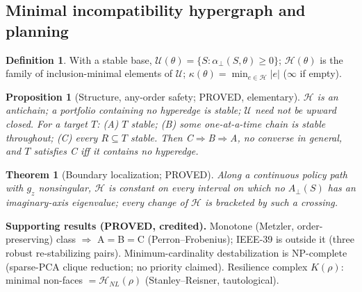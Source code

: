 \documentclass[10pt,a4paper]{article}
\newtheorem{theorem}{Theorem}
\newtheorem{proposition}{Proposition}
\theoremstyle{definition}
\newtheorem{definition}{Definition}
\newcommand{\Hy}{\mathcal{H}}
\newcommand{\aperp}{\alpha_\perp}
\newcommand{\Aperp}{A_\perp}
\newcommand{\status}[1]{\textsf{\small #1}}
\begin{document}
\subsection{Minimal incompatibility hypergraph and planning}
\begin{definition}
With a stable base, $\mathcal U(\theta)=\{S:\aperp(S,\theta)\ge0\}$; $\Hy(\theta)$ is the family of
inclusion-minimal elements of $\mathcal U$; $\kappa(\theta)=\min_{e\in\Hy}|e|$ ($\infty$ if empty).
\end{definition}
\begin{proposition}[Structure, any-order safety; \status{PROVED}, elementary]
$\Hy$ is an antichain; a portfolio containing no hyperedge is stable; $\mathcal U$ need not be upward
closed. For a target $T$: (A) $T$ stable; (B) some one-at-a-time chain is stable throughout; (C) every
$R\subseteq T$ stable. Then C$\Rightarrow$B$\Rightarrow$A, no converse in general, and $T$ satisfies C iff it
contains no hyperedge.
\end{proposition}
\begin{theorem}[Boundary localization; \status{PROVED}]
Along a continuous policy path with $g_z$ nonsingular, $\Hy$ is constant on every interval on which no
$\Aperp(S)$ has an imaginary-axis eigenvalue; every change of $\Hy$ is bracketed by such a crossing.
\end{theorem}
\textbf{Supporting results (\status{PROVED}, credited).} Monotone (Metzler, order-preserving) class
$\Rightarrow$ A$=$B$=$C (Perron--Frobenius); IEEE-39 is outside it (three robust re-stabilizing pairs).
Minimum-cardinality destabilization is NP-complete (sparse-PCA clique reduction; no priority claimed).
Resilience complex $K(\rho)$: minimal non-faces $=\Hy_{NL}(\rho)$ (Stanley--Reisner, tautological).
\end{document}
